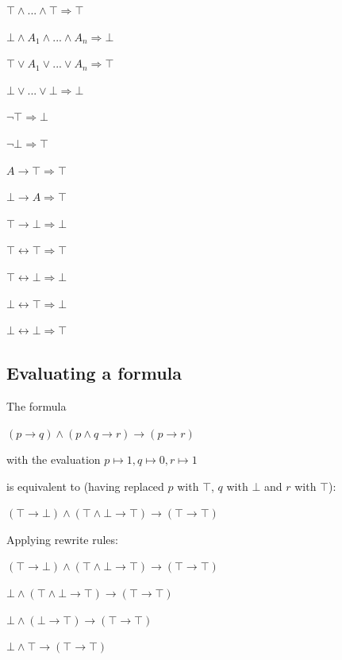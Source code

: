 \documentclass[11pt,a4paper]{article}
\begin{document}
$\top \wedge ... \wedge \top \Rightarrow \top$

$\bot \wedge A_1 \wedge ... \wedge A_n \Rightarrow \bot$

\hrulefill

$\top \vee A_1 \vee ... \vee A_n \Rightarrow \top$

$\bot \vee ... \vee \bot \Rightarrow \bot$

\hrulefill

$\neg \top \Rightarrow \bot$

$\neg \bot \Rightarrow \top$

\hrulefill

$A \rightarrow \top \Rightarrow \top$

$\bot \rightarrow A \Rightarrow \top$

$\top \rightarrow \bot \Rightarrow \bot$

\hrulefill

$\top \leftrightarrow \top \Rightarrow \top$

$\top \leftrightarrow \bot \Rightarrow \bot$

$\bot \leftrightarrow \top \Rightarrow \bot$

$\bot \leftrightarrow \bot \Rightarrow \top$

\subsection{Evaluating a formula}

The formula

$(p \rightarrow q) \wedge (p \wedge q \rightarrow r) \rightarrow (p \rightarrow r)$

with the evaluation
${p \mapsto 1, q \mapsto 0, r \mapsto 1}$

is equivalent to (having replaced $p$ with $\top$, $q$ with $\bot$ and $r$ with $\top$):

$(\top \rightarrow \bot) \wedge (\top \wedge \bot \rightarrow \top) \rightarrow (\top \rightarrow \top)$

\vspace{5pt}
Applying rewrite rules:

$(\top \rightarrow \bot) \wedge (\top \wedge \bot \rightarrow \top) \rightarrow (\top \rightarrow \top)$

$\bot \wedge (\top \wedge \bot \rightarrow \top) \rightarrow (\top \rightarrow \top)$

$\bot \wedge (\bot \rightarrow \top) \rightarrow (\top \rightarrow \top)$

$\bot \wedge \top \rightarrow (\top \rightarrow \top)$
\end{document}
